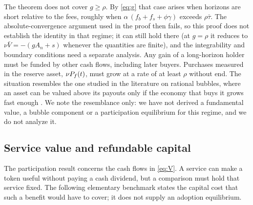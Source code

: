 The theorem does not cover $g\ge\rho$. By \eqref{eq:g} that case arises when horizons are short relative to the fees, roughly when $\alpha\,(f_b+f_s+\phi\gamma)$ exceeds $\rho\bar\tau$. The absolute-convergence argument used in the proof then fails, so this proof does not establish the identity in that regime; it can still hold there (at $g=\rho$ it reduces to $\nu\bar V=-(gA_n+s)$ whenever the quantities are finite), and the integrability and boundary conditions need a separate analysis. Any gain of a long-horizon holder must be funded by other cash flows, including later buyers. Purchases measured in the reserve asset, $\nu P_f(t)$, must grow at a rate of at least $\rho$ without end. The situation resembles the one studied in the literature on rational bubbles, where an asset can be valued above its payouts only if the economy that buys it grows fast enough \citep{tirole1985,santos1997}. We note the resemblance only: we have not derived a fundamental value, a bubble component or a participation equilibrium for this regime, and we do not analyze it.

\subsection{Service value and refundable capital}\label{sec:deposit-benchmark}

The participation result concerns the cash flows in \eqref{eq:V}. A service can make a token useful without paying a cash dividend, but a comparison must hold that service fixed. The following elementary benchmark states the capital cost that such a benefit would have to cover; it does not supply an adoption equilibrium.

